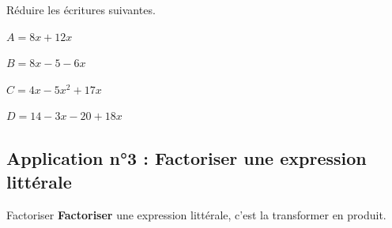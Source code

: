 \documentclass[a4paper]{book}
\begin{document}
    \begin{exemple}
        Réduire les écritures suivantes.

        \medskip
        
        \begin{minipage}{0.24\linewidth}
            $A=8x+12x$

            \vspace{2cm}
        \end{minipage}
        \hfill\vline\hfill
        \begin{minipage}{0.24\linewidth}
            $B=8x-5-6x$

            \vspace{2cm}
        \end{minipage}
        \hfill\vline\hfill
        \begin{minipage}{0.24\linewidth}
            $C=4x-5x^2+17x$

            \vspace{2cm}
        \end{minipage}
        \hfill\vline\hfill
        \begin{minipage}{0.24\linewidth}
            $D=14-3x-20+18x$

            \vspace{2cm}
        \end{minipage}
    \end{exemple}
    

\subsection{Application n°3 : Factoriser une expression littérale}
    \begin{definitionTitre}{Factoriser}
        \textbf{Factoriser} une expression littérale, c'est la transformer en produit.
    \end{definitionTitre}
\end{document}
